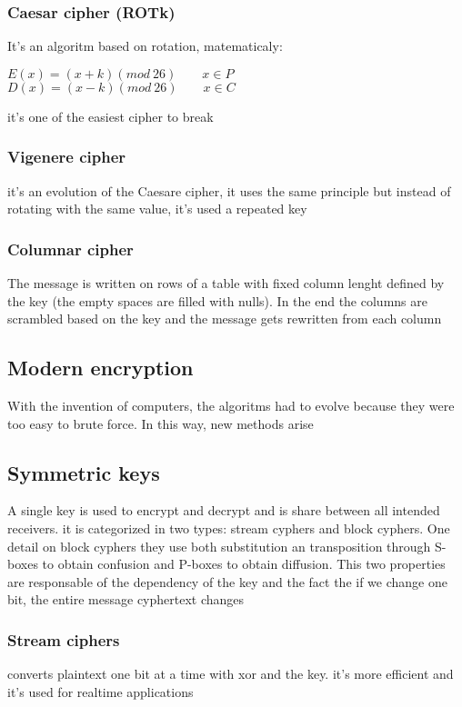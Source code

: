 \documentclass[12pt, a4paper]{article}
\begin{document}
\subsubsection{Caesar cipher (ROTk)}
It's an algoritm based on rotation, matematicaly:
\begin{center}
    $E(x)=(x+k)(mod\ 26)\qquad x\in P$\\
    $D(x)=(x-k)(mod\ 26)\qquad x\in C$
\end{center}
it's one of the easiest cipher to break

\subsubsection{Vigenere cipher}
it's an evolution of the Caesare cipher, it uses the same principle but instead of rotating with the same value, it's
used a repeated key

\subsubsection{Columnar cipher}
The message is written on rows of a table with fixed column lenght defined by the key (the empty spaces are filled with
nulls). In the end the columns are scrambled based on the key and the message gets rewritten from each column

\subsection{Modern encryption}
With the invention of computers, the algoritms had to evolve because they were too easy to brute force. In this way, new 
methods arise 

\subsection{Symmetric keys}
A single key is used to encrypt and decrypt and is share between all intended receivers. it is categorized in two types: 
stream cyphers and block cyphers. One detail on block cyphers they use both substitution an transposition through S-boxes
to obtain confusion and P-boxes to obtain diffusion. This two properties are responsable of the dependency of the key and 
the fact the if we change one bit, the entire message cyphertext changes

\subsubsection*{Stream ciphers}
converts plaintext one bit at a time with xor and the key. it's more efficient and it's used for realtime applications
\end{document}
